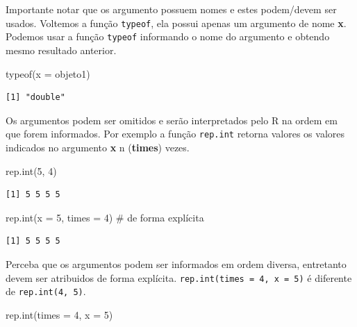 \documentclass[
  letterpaper,
  DIV=11,
  numbers=noendperiod]{scrreprt}
\newenvironment{Shaded}{\begin{snugshade}}{\end{snugshade}}
\newcommand{\AttributeTok}[1]{\textcolor[rgb]{0.40,0.45,0.13}{#1}}
\newcommand{\CommentTok}[1]{\textcolor[rgb]{0.37,0.37,0.37}{#1}}
\newcommand{\DecValTok}[1]{\textcolor[rgb]{0.68,0.00,0.00}{#1}}
\newcommand{\FunctionTok}[1]{\textcolor[rgb]{0.28,0.35,0.67}{#1}}
\newcommand{\NormalTok}[1]{\textcolor[rgb]{0.00,0.23,0.31}{#1}}
\begin{document}
Importante notar que os argumento possuem nomes e estes podem/devem ser
usados. Voltemos a função \texttt{typeof}, ela possui apenas um
argumento de nome \textbf{x}. Podemos usar a função \texttt{typeof}
informando o nome do argumento e obtendo mesmo resultado anterior.

\begin{Shaded}
\begin{Highlighting}[]
\FunctionTok{typeof}\NormalTok{(}\AttributeTok{x =}\NormalTok{ objeto1)}
\end{Highlighting}
\end{Shaded}

\begin{verbatim}
[1] "double"
\end{verbatim}

Os argumentos podem ser omitidos e serão interpretados pelo R na ordem
em que forem informados. Por exemplo a função \texttt{rep.int} retorna
valores os valores indicados no argumento \textbf{x} n (\textbf{times})
vezes.

\begin{Shaded}
\begin{Highlighting}[]
\FunctionTok{rep.int}\NormalTok{(}\DecValTok{5}\NormalTok{, }\DecValTok{4}\NormalTok{)}
\end{Highlighting}
\end{Shaded}

\begin{verbatim}
[1] 5 5 5 5
\end{verbatim}

\begin{Shaded}
\begin{Highlighting}[]
\FunctionTok{rep.int}\NormalTok{(}\AttributeTok{x =} \DecValTok{5}\NormalTok{, }\AttributeTok{times =} \DecValTok{4}\NormalTok{) }\CommentTok{\# de forma explícita}
\end{Highlighting}
\end{Shaded}

\begin{verbatim}
[1] 5 5 5 5
\end{verbatim}

Perceba que os argumentos podem ser informados em ordem diversa,
entretanto devem ser atribuidos de forma explícita.
\texttt{rep.int(times\ =\ 4,\ x\ =\ 5)} é diferente de
\texttt{rep.int(4,\ 5)}.

\begin{Shaded}
\begin{Highlighting}[]
\FunctionTok{rep.int}\NormalTok{(}\AttributeTok{times =} \DecValTok{4}\NormalTok{, }\AttributeTok{x =} \DecValTok{5}\NormalTok{)}
\end{Highlighting}
\end{Shaded}
\end{document}
